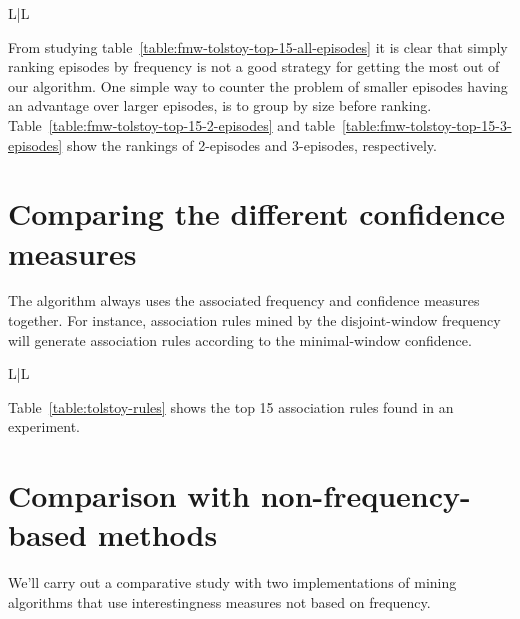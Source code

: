 \begin{table}
\begin{tabulary}{\textwidth}{L|L}
\end{tabulary}

\caption{The top 15 parallel 3-episodes found by our algorithm, with $ \rho = 15 $, and for the three frequency measures.}
\label{table:fmw-tolstoy-top-15-3-episodes}
\end{table}

From studying table~\ref{table:fmw-tolstoy-top-15-all-episodes} it is clear that simply ranking episodes by frequency is not a good strategy for getting the most out of our algorithm. One simple way to counter the problem of smaller episodes having an advantage over larger episodes, is to group by size before ranking. Table~\ref{table:fmw-tolstoy-top-15-2-episodes} and table~\ref{table:fmw-tolstoy-top-15-3-episodes} show the rankings of 2-episodes and 3-episodes, respectively.





\section{Comparing the different confidence measures}

The algorithm always uses the associated frequency and confidence measures together. For instance, association rules mined by the disjoint-window frequency will generate association rules according to the minimal-window confidence.

\begin{table}

\begin{tabulary}{\textwidth}{L|L}



\end{tabulary}

\end{table}

Table~\ref{table:tolstoy-rules} shows the top 15 association rules found in an experiment.




\section{Comparison with non-frequency-based methods}

We'll carry out a comparative study with two implementations of mining algorithms that use interestingness measures not based on frequency.

